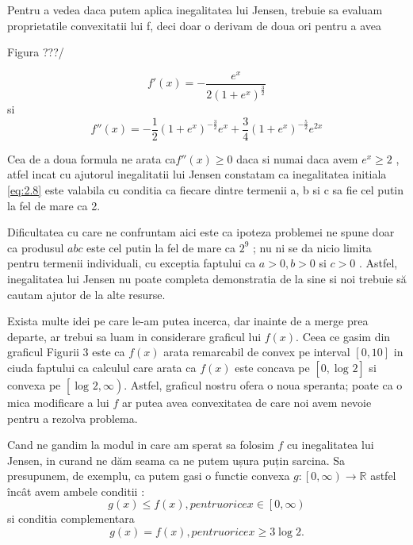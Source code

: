 \documentclass[a4paper,12pt,oneside]{report}
\begin{document}
Pentru a vedea daca putem aplica inegalitatea lui Jensen, trebuie sa evaluam proprietatile convexitatii lui f,  deci doar o derivam de doua ori pentru a avea  

Figura ???/

\begin{displaymath}
  {f}'\left ( x \right ) = -\frac{e^{x}}{2 \left ( 1 + e^{x} \right )^{\frac{3}{2}}}
\end{displaymath}
si
\begin{displaymath}
  {f}''\left ( x \right ) = -\frac{1}{2}\left (  1 + e^{x} \right )^{-\frac{3}{2}}e^{x} + \frac{3}{4}\left ( 1 + e^{x} \right )^{-\frac{5}{2}}e^{2x}
\end{displaymath}

Cea de a doua formula ne arata ca\({f}''\left ( x \right ) \geq 0\) daca si numai daca avem \(e^{x}\geq 2\) , atfel incat cu ajutorul inegalitatii lui Jensen  constatam ca inegalitatea initiala \ref{eq:2.8}  este valabila cu conditia ca fiecare dintre termenii a, b si c sa fie cel putin la fel de mare ca 2. 

Dificultatea cu care ne confruntam aici este ca ipoteza problemei  ne spune doar  ca produsul \(abc\) este cel putin la fel de mare ca \(2^{9}\) ; nu ni se da nicio  limita pentru termenii  individuali, cu exceptia faptului ca \( a > 0, b > 0 \) si \(c > 0\) . Astfel, inegalitatea lui Jensen nu poate completa demonstratia de la sine si noi trebuie să cautam ajutor de la alte resurse. 

Exista multe idei pe care le-am putea incerca, dar inainte de a merge prea departe,  ar trebui sa luam in considerare graficul lui \(f\left ( x \right )\). Ceea ce  gasim  din graficul  Figurii 3 este ca \(f\left ( x \right ) \) arata remarcabil de convex pe interval \(\left [ 0, 10 \right ]  \) in ciuda faptului ca calculul care arata ca \(f\left ( x \right ) \) este concava pe \(\left [ 0, \log _{} 2\right ] \) si convexa pe \(\left [ \log _{} 2 , \infty \right ) \). Astfel, graficul nostru ofera o noua speranta; poate ca o mica modificare a lui \(f\) ar putea avea convexitatea de care noi avem nevoie pentru a rezolva problema.

Cand ne gandim la modul in care am sperat sa folosim \(f\) cu inegalitatea lui Jensen, in curand ne dăm seama ca ne putem ușura puțin sarcina. Sa presupunem, de exemplu, ca putem gasi o functie convexa \(g : \left [ 0 , \infty  \right ) \to \mathbb{R}\) astfel încât avem ambele conditii : 
\begin{displaymath}
  g\left ( x \right ) \leq  f\left ( x  \right ), pentru orice x \in  \left [ 0 , \infty  \right )    \label{eq:2.9} \tag{2.9}
\end{displaymath}
si conditia complementara
\begin{displaymath}
  g \left ( x \right ) = f \left ( x \right ) , pentru orice  x\geq 3 \log 2. \label{eq:2.10} \tag{2.10}
\end{displaymath}
\end{document}
